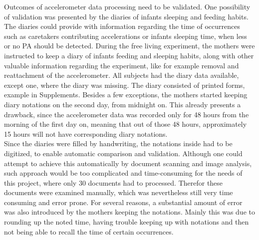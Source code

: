 \documentclass{article}
\begin{document}
{Outcomes of accelerometer data processing need to be validated. One possibility of validation was presented by the diaries of infants sleeping and feeding habits. The diaries could provide with information regarding the time of occurrences such as caretakers contributing accelerations or infants sleeping time, when less or no PA should be detected.
During the free living experiment, the mothers were instructed to keep a diary of infants feeding and sleeping habits, along with other valuable information regarding the experiment, like for example removal and reattachment of the accelerometer. All subjects had the diary data available, except one, where the diary was missing. The diary consisted of printed forms, example in Supplements. Besides a few exceptions, the mothers started keeping diary notations on the second day, from midnight on. This already presents a drawback, since the accelerometer data was recorded only for 48 hours from the morning of the first day on, meaning that out of those 48 hours, approximately 15 hours will not have corresponding diary notations. \\Since the diaries were filled by handwriting, the notations inside had to be digitized, to enable automatic comparison and validation. Although one could attempt to achieve this automatically by document scanning and image analysis, such approach would be too complicated and time-consuming for the needs of this project, where only 30 documents had to processed. Therefor these documents were examined manually, which was nevertheless still very time consuming and error prone. For several reasons, a substantial amount of error was also introduced by the mothers keeping the notations. Mainly this was due to rounding up the noted time, having trouble keeping up with notations and then not being able to recall the time of certain occurrences.\\
}
\end{document}
